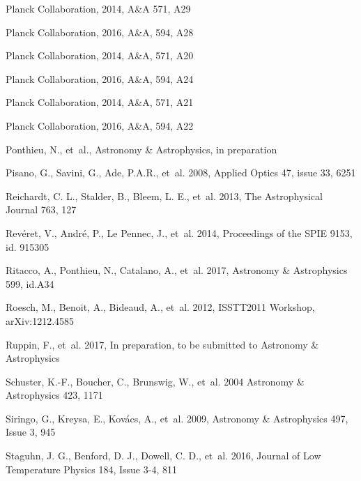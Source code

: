 \begin{thebibliography}{99}
Planck Collaboration, 2014, A\&A 571, A29

Planck Collaboration, 2016, A\&A, 594, A28

Planck Collaboration, 2014, A\&A, 571, A20

Planck Collaboration, 2016, A\&A, 594, A24

Planck Collaboration, 2014, A\&A, 571, A21

Planck Collaboration, 2016, A\&A, 594, A22

Ponthieu, N., {et~al.}, 
Astronomy \& Astrophysics, in preparation

Pisano, G., Savini, G., Ade, P.A.R., {et~al.} 2008, 
Applied Optics 47, issue 33, 6251

Reichardt, C. L., Stalder, B., Bleem, L. E., {et~al.} 2013, 
The Astrophysical Journal 763, 127

Rev\'eret, V., Andr\'e, P., Le Pennec, J., {et~al.} 2014, 
Proceedings of the SPIE 9153, id. 915305

Ritacco, A., Ponthieu, N., Catalano, A., {et~al.} 2017, 
Astronomy \& Astrophysics 599, id.A34

Roesch, M., Benoit, A., Bideaud, A., {et~al.} 2012, 
ISSTT2011 Workshop, arXiv:1212.4585

Ruppin, F., {et~al.} 2017, 
In preparation, to be submitted to Astronomy \& Astrophysics

Schuster, K.-F., Boucher, C., Brunswig, W., {et~al.} 2004 
Astronomy \& Astrophysics 423, 1171

Siringo, G., Kreysa, E., Kov\'acs, A., {et~al.} 2009, 
Astronomy \& Astrophysics 497, Issue 3, 945

Staguhn, J. G., Benford, D. J., Dowell, C. D., {et~al.} 2016,
Journal of Low Temperature Physics 184, Issue 3-4, 811


\end{thebibliography}
